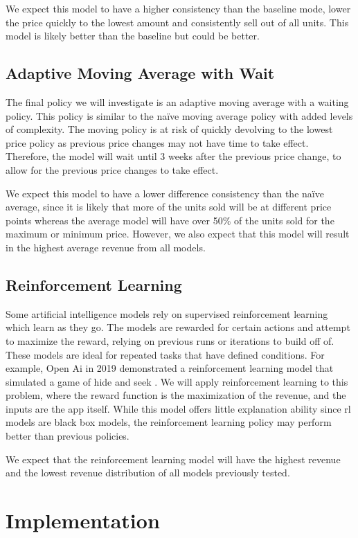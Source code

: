 \documentclass[11pt,a4paper]{article}
\begin{document}
We expect this model to have a higher consistency than the baseline mode, lower the price quickly to the lowest amount and consistently sell out of all units. This model is likely better than the baseline but could be better.

\subsection{Adaptive Moving Average with Wait}
The final policy we will investigate is an adaptive moving average with a waiting policy. 
This policy is similar to the naïve moving average policy with added levels of complexity. 
The moving policy is at risk of quickly devolving to the lowest price policy as previous price changes may not have time to take effect. 
Therefore, the model will wait until 3 weeks after the previous price change, to allow for the previous price changes to take effect.

We expect this model to have a lower difference consistency than the naïve average, since it is likely that more of the units sold will be at different price points whereas the average model will have over 50\% of the units sold for the maximum or minimum price. 
However, we also expect that this model will result in the highest average revenue from all models.

\subsection{Reinforcement Learning}
Some artificial intelligence models rely on supervised reinforcement learning which learn as they go. 
The models are rewarded for certain actions and attempt to maximize the reward, relying on previous runs or iterations to build off of. 
These models are ideal for repeated tasks that have defined conditions. 
For example, Open Ai in 2019 demonstrated a reinforcement learning model that simulated a game of hide and seek \cite{baker2019emergent}.
We will apply reinforcement learning to this problem, where the reward function is the maximization of the revenue, and the inputs are the app itself. 
While this model offers little explanation ability since rl models are black box models, the reinforcement learning policy may perform better than previous policies. 

We expect that the reinforcement learning model will have the highest revenue and the lowest revenue distribution of all models previously tested. 

\section{Implementation}
\end{document}

